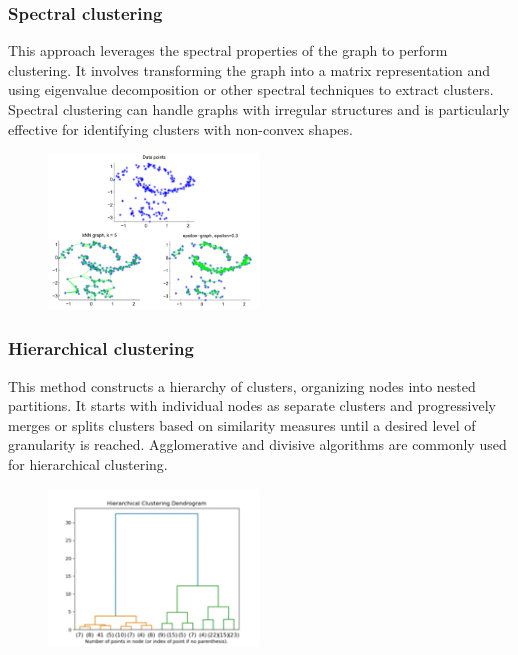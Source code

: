 \documentclass[12pt, a4paper]{article}
\begin{document}
\begin{flushleft}
        \subsubsection{Spectral clustering}
        \begin{flushleft}
            This approach leverages the spectral properties of the graph to perform clustering. It involves transforming the graph into a matrix representation and using eigenvalue decomposition or other spectral techniques to extract clusters. Spectral clustering can handle graphs with irregular structures and is particularly effective for identifying clusters with non-convex shapes.
            \begin{figure}[h]
            \centering
            \includegraphics[width=0.5\textwidth]{spectral_based.png}
            \end{figure}
        \end{flushleft}

        \subsubsection{Hierarchical clustering}
        This method constructs a hierarchy of clusters, organizing nodes into nested partitions. It starts with individual nodes as separate clusters and progressively merges or splits clusters based on similarity measures until a desired level of granularity is reached. Agglomerative and divisive algorithms are commonly used for hierarchical clustering.
        \begin{figure}[h]
        \centering
        \includegraphics[width=0.5\textwidth]{Heirarchy_based.png}
        \end{figure}


\end{flushleft}
\end{document}
